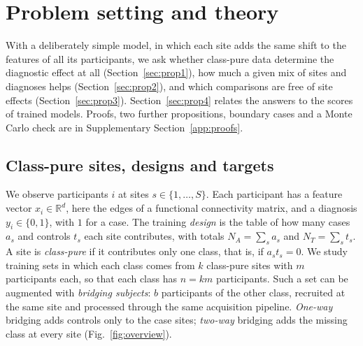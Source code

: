 \section{Problem setting and theory}\label{sec:theory}

With a deliberately simple model, in which each site adds the same shift to the features of all its participants, we ask whether class-pure data determine the diagnostic effect at all (Section~\ref{sec:prop1}), how much a given mix of sites and diagnoses helps (Section~\ref{sec:prop2}), and which comparisons are free of site effects (Section~\ref{sec:prop3}). Section~\ref{sec:prop4} relates the answers to the scores of trained models. Proofs, two further propositions, boundary cases and a Monte Carlo check are in Supplementary Section~\ref{app:proofs}.

\subsection{Class-pure sites, designs and targets}\label{sec:setting}

We observe participants $i$ at sites $s\in\{1,\dots,S\}$. Each participant has a feature vector $x_i\in\mathbb{R}^d$, here the edges of a functional connectivity matrix, and a diagnosis $y_i\in\{0,1\}$, with $1$ for a case. The training \emph{design} is the table of how many cases $a_s$ and controls $t_s$ each site contributes, with totals $N_A=\sum_s a_s$ and $N_T=\sum_s t_s$. A site is \emph{class-pure} if it contributes only one class, that is, if $a_st_s=0$. We study training sets in which each class comes from $k$ class-pure sites with $m$ participants each, so that each class has $n=km$ participants. Such a set can be augmented with \emph{bridging subjects}: $b$ participants of the other class, recruited at the same site and processed through the same acquisition pipeline. \emph{One-way} bridging adds controls only to the case sites; \emph{two-way} bridging adds the missing class at every site (Fig.~\ref{fig:overview}).

